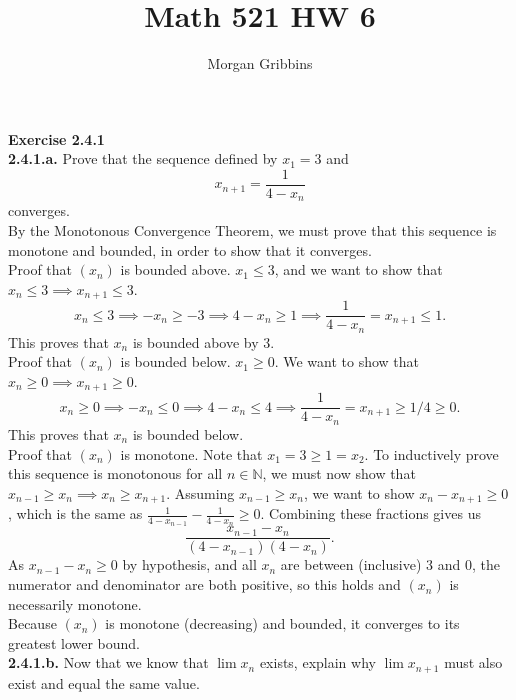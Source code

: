 \documentclass[12pt,letterpaper]{article}
\title{Math 521 HW 6}
\author{Morgan Gribbins}
\date{}
\begin{document}
	
\maketitle

\textbf{Exercise 2.4.1} \\

\textbf{2.4.1.a.} Prove that the sequence defined by \(x_{1} = 3\) and \[x_{n+1} = \frac{1}{4-x_{n}}\] converges. \\

By the Monotonous Convergence Theorem, we must prove that this sequence is monotone and bounded, in order to show that it converges. \\

Proof that \((x_{n})\) is bounded above. \(x_{1} \leq 3\), and we want to show that \(x_{n} \leq 3 \implies x_{n+1} \leq 3\). \[x_{n} \leq 3 \implies -x_{n} \geq -3 \implies 4-x_{n} \geq 1 \implies \frac{1}{4-x_{n}} =x_{n+1} \leq 1.\] This proves that \(x_{n}\) is bounded above by \(3\). \\

Proof that \((x_{n})\) is bounded below. \(x_{1} \geq 0\). We want to show that \(x_{n} \geq 0 \implies x_{n+1} \geq 0\). \[x_{n} \geq 0 \implies -x_{n} \leq 0 \implies 4-x_{n} \leq 4 \implies \frac{1}{4-x_{n}} = x_{n+1} \geq 1/4 \geq 0.\] This proves that \(x_{n}\) is bounded below. \\

Proof that \((x_{n})\) is monotone. Note that \(x_{1} = 3 \geq 1 = x_{2}\). To inductively prove this sequence is monotonous for all \(n \in \mathbb{N}\), we must now show that \(x_{n-1} \geq x_{n} \implies x_{n} \geq x_{n+1}\). Assuming \(x_{n-1} \geq x_{n}\), we want to show \(x_{n} - x_{n+1} \geq 0\), which is the same as \(\frac{1}{4-x_{n-1}} - \frac{1}{4-x_{n}} \geq 0\). Combining these fractions gives us \[\frac{x_{n-1}-x_{n}}{(4-x_{n-1})(4-x_{n})}.\] As \(x_{n-1} - x_{n} \geq 0\) by hypothesis, and all \(x_{n}\) are between (inclusive) 3 and 0, the numerator and denominator are both positive, so this holds and \((x_{n})\) is necessarily monotone. \\

Because \((x_{n})\) is monotone (decreasing) and bounded, it converges to its greatest lower bound. \\

\textbf{2.4.1.b.} Now that we know that \(\lim x_{n}\) exists, explain why \(\lim x_{n+1}\) must also exist and equal the same value. \\
\end{document}
